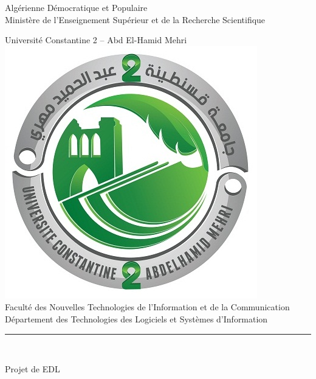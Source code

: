 \documentclass[french,11pt]{report}
\begin{document}
\begin{titlepage}
    \begin{center}
        \large Algérienne Démocratique et Populaire\\

        \large Ministère de l’Enseignement Supérieur et de la Recherche Scientifique

        \large Université Constantine 2 – Abd El-Hamid Mehri\\

        \vspace{0.01\textheight}
        \includegraphics[width=0.2\textheight]{logo.jpg}\\

        Faculté des Nouvelles Technologies de l’Information et de la Communication\\
        Département des Technologies des Logiciels et Systèmes d’Information\\

        \vspace{0.025\textheight}
        \par\noindent\rule{10cm}{3pt}\\
        \vspace{0.05\textheight}

        \large{Projet de EDL}\\

        \vspace{0.025\textheight}
    \end{center}


\end{titlepage}
\end{document}
